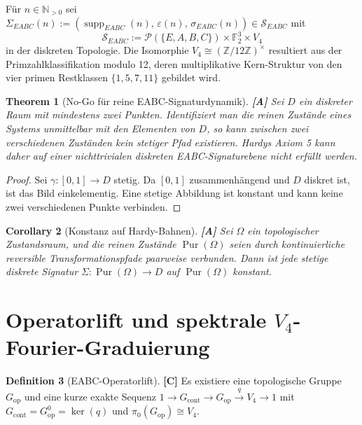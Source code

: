 \documentclass[11pt,a4paper,reqno]{amsart}
\newtheorem{theorem}{Theorem}[section]
\newtheorem{corollary}[theorem]{Corollary}
\theoremstyle{definition}
\newtheorem{definition}[theorem]{Definition}
\theoremstyle{remark}
\newcommand{\F}{\mathbb{F}}
\newcommand{\Pur}{\operatorname{Pur}}
\newcommand{\supp}{\operatorname{supp}}
\begin{document}
	F\"ur $n \in \mathbb{N}_{>0}$ sei $\Sigma_{EABC}(n) := \left( \supp_{EABC}(n), \, \varepsilon(n), \, \sigma_{EABC}(n) \right) \in \mathcal{S}_{EABC}$ mit
	\begin{equation}
		\mathcal{S}_{EABC} := \mathcal{P}(\{E,A,B,C\}) \times \F_2^3 \times V_4
	\end{equation}
	in der diskreten Topologie. Die Isomorphie $V_4 \cong (\mathbb{Z}/12\mathbb{Z})^\times$ resultiert aus der Primzahlklassifikation modulo 12, deren multiplikative Kern-Struktur von den vier primen Restklassen $\{1, 5, 7, 11\}$ gebildet wird.
	
	\begin{theorem}[No-Go f\"ur reine EABC-Signaturdynamik] \textbf{[A]}
		\label{thm:nogo}
		Sei $D$ ein diskreter Raum mit mindestens zwei Punkten. Identifiziert man die reinen Zust\"ande eines Systems unmittelbar mit den Elementen von $D$, so kann zwischen zwei verschiedenen Zust\"anden kein stetiger Pfad existieren. Hardys Axiom 5 kann daher auf einer nichttrivialen diskreten EABC-Signaturebene nicht erf\"ullt werden.
	\end{theorem}
	
	\begin{proof}
		Sei $\gamma: [0,1] \to D$ stetig. Da $[0,1]$ zusammenh\"angend und $D$ diskret ist, ist das Bild einkelementig. Eine stetige Abbildung ist konstant und kann keine zwei verschiedenen Punkte verbinden.
	\end{proof}
	
	\begin{corollary}[Konstanz auf Hardy-Bahnen] \textbf{[A]}
		Sei $\Omega$ ein topologischer Zustandsraum, und die reinen Zust\"ande $\Pur(\Omega)$ seien durch kontinuierliche reversible Transformationspfade paarweise verbunden. Dann ist jede stetige diskrete Signatur $\Sigma: \Pur(\Omega) \to D$ auf $\Pur(\Omega)$ konstant.
	\end{corollary}
	
	\section{Operatorlift und spektrale $V_4$-Fourier-Graduierung}
	
	\begin{definition}[EABC-Operatorlift] \textbf{[C]}
		Es existiere eine topologische Gruppe $G_{\mathrm{op}}$ und eine kurze exakte Sequenz $1 \to G_{\mathrm{cont}} \to G_{\mathrm{op}} \xrightarrow{q} V_4 \to 1$ mit $G_{\mathrm{cont}} = G_{\mathrm{op}}^0 = \operatorname{ker}(q)$ und $\pi_0(G_{\mathrm{op}}) \cong V_4$.
	\end{definition}
	
\end{document}
